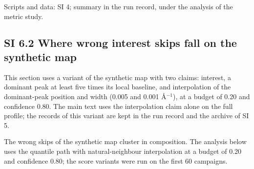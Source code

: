 \documentclass{iopjournal}
\begin{document}
Scripts and data: SI 4; summary in the run record, under the analysis of the metric study.

\hypertarget{si-6.2-where-wrong-interest-skips-fall-on-the-synthetic-map}{%
\subsection*{SI 6.2 Where wrong interest skips fall on the synthetic map}\label{si-6.2-where-wrong-interest-skips-fall-on-the-synthetic-map}}

This section uses a variant of the synthetic map with two claims: interest, a dominant peak at least five times its local baseline, and interpolation of the dominant-peak position and width (0.005 and 0.001 \AA{}\ensuremath{^{-1}}), at a budget of 0.20 and confidence 0.80. The main text uses the interpolation claim alone on the full profile; the records of this variant are kept in the run record and the archive of SI 5.

The wrong skips of the synthetic map cluster in composition. The analysis below uses the quantile path with natural-neighbour interpolation at a budget of 0.20 and confidence 0.80; the score variants were run on the first 60 campaigns.
\end{document}

